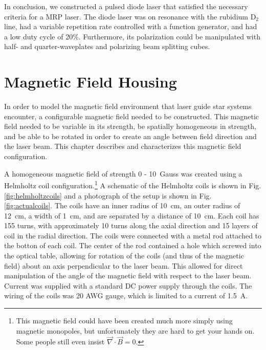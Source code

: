 In conclusion, we constructed a pulsed diode laser that satisfied the necessary criteria for a MRP laser. The diode laser was on resonance with the rubidium D$_2$ line, had a variable repetition rate controlled with a function generator, and had a low duty cycle of 20\%. Furthermore, its polarization could be manipulated with half- and quarter-waveplates and polarizing beam splitting cubes.

\chapter{Magnetic Field Housing}


In order to model the magnetic field environment that laser guide star systems encounter, a configurable magnetic field needed to be constructed. This magnetic field needed to be variable in its strength, be spatially homogeneous in strength, and be able to be rotated in order to create an angle between field direction and the laser beam. This chapter describes and characterizes this magnetic field configuration.

A homogeneous magnetic field of strength 0 - \SI{10}{Gauss} was created using a Helmholtz coil configuration.\footnote{This magnetic field could have been created much more simply using magnetic monopoles, but unfortunately they are hard to get your hands on. Some people still even insist $\vec \nabla \cdot \vec B = 0$.} A schematic of the Helmholtz coils is shown in Fig. \ref{fig:helmholtzcoils} and a photograph of the setup is shown in Fig. \ref{fig:actualcoils}. The coils have an inner radius of \SI{10}{\centi \meter}, an outer radius of \SI{12}{\centi \meter}, a width of \SI{1}{\centi \meter}, and are separated by a distance of \SI{10}{\centi \meter}. Each coil has 155 turns, with approximately 10 turns along the axial direction and 15 layers of coil in the radial direction. The coils were connected with a metal rod attached to the botton of each coil. The center of the rod contained a hole which screwed into the optical table, allowing for rotation of the coils (and thus of the magnetic field) about an axis perpendicular to the laser beam. This allowed for direct manipulation of the angle of the magnetic field with respect to the laser beam. Current was supplied with a standard DC power supply through the coils. The wiring of the coils was 20 AWG gauge, which is limited to a current of \SI{1.5}{ A}.

